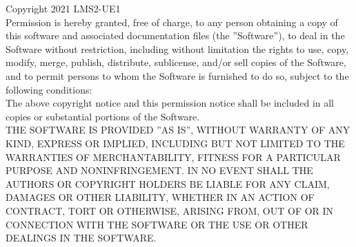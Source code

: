 Copyright 2021 LMS2-UE1 \linebreak
\\
Permission is hereby granted,  free of charge,  to any person obtaining a copy of this software and associated documentation files (the ''Software''), to deal in the Software without restriction,  including without limitation the rights to use, copy, modify, merge, publish, distribute, sublicense, and/or sell copies of the Software,  and to permit persons to whom the Software is furnished to do so,  subject to the following conditions:\linebreak
\\
The above copyright notice and this permission notice shall be included in all copies or substantial portions of the Software.\linebreak
\\
THE SOFTWARE IS PROVIDED ''AS IS'', WITHOUT WARRANTY OF ANY KIND, EXPRESS OR IMPLIED, INCLUDING BUT NOT LIMITED TO THE WARRANTIES OF MERCHANTABILITY, FITNESS FOR A PARTICULAR PURPOSE AND NONINFRINGEMENT. IN NO EVENT SHALL THE AUTHORS OR COPYRIGHT HOLDERS BE LIABLE FOR ANY CLAIM, DAMAGES OR OTHER LIABILITY, WHETHER IN AN ACTION OF CONTRACT, TORT OR OTHERWISE, ARISING FROM, OUT OF OR IN CONNECTION WITH THE SOFTWARE OR THE USE OR OTHER DEALINGS IN THE SOFTWARE.
